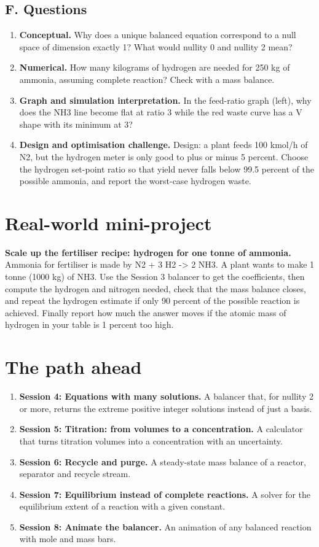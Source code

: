 \documentclass[11pt,a4paper]{article}
\begin{document}
\subsection*{F. Questions}
\begin{enumerate}[nosep]
\item \textbf{Conceptual.} Why does a unique balanced equation correspond to a null space of dimension exactly 1? What would nullity 0 and nullity 2 mean?
\item \textbf{Numerical.} How many kilograms of hydrogen are needed for 250 kg of ammonia, assuming complete reaction? Check with a mass balance.
\item \textbf{Graph and simulation interpretation.} In the feed-ratio graph (left), why does the NH3 line become flat at ratio 3 while the red waste curve has a V shape with its minimum at 3?
\item \textbf{Design and optimisation challenge.} Design: a plant feeds 100 kmol/h of N2, but the hydrogen meter is only good to plus or minus 5 percent. Choose the hydrogen set-point ratio so that yield never falls below 99.5 percent of the possible ammonia, and report the worst-case hydrogen waste.
\end{enumerate}

\section{Real-world mini-project}
\textbf{Scale up the fertiliser recipe: hydrogen for one tonne of ammonia.} Ammonia for fertiliser is made by N2 + 3 H2 -\textgreater{} 2 NH3. A plant wants to make 1 tonne (1000 kg) of NH3. Use the Session 3 balancer to get the coefficients, then compute the hydrogen and nitrogen needed, check that the mass balance closes, and repeat the hydrogen estimate if only 90 percent of the possible reaction is achieved. Finally report how much the answer moves if the atomic mass of hydrogen in your table is 1 percent too high.

\section{The path ahead}
\begin{enumerate}[nosep]
\item \textbf{Session 4: Equations with many solutions.} A balancer that, for nullity 2 or more, returns the extreme positive integer solutions instead of just a basis.
\item \textbf{Session 5: Titration: from volumes to a concentration.} A calculator that turns titration volumes into a concentration with an uncertainty.
\item \textbf{Session 6: Recycle and purge.} A steady-state mass balance of a reactor, separator and recycle stream.
\item \textbf{Session 7: Equilibrium instead of complete reactions.} A solver for the equilibrium extent of a reaction with a given constant.
\item \textbf{Session 8: Animate the balancer.} An animation of any balanced reaction with mole and mass bars.
\end{enumerate}
\end{document}
